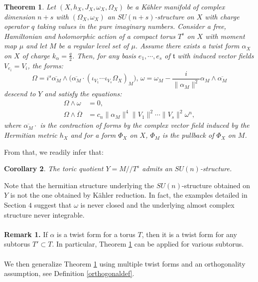 \documentclass[12pt, reqno]{amsart}
\newtheorem{introthm}{Theorem}
\newtheorem{introcor}[introthm]{Corollary}
\newcommand{\tor}{\mathfrak{t}}
\begin{document}
\begin{introthm}\label{twistsimpletheo}
        Let $(X,h_X,J_X,\omega_X,\Omega_X)$ be a Kähler manifold of complex dimension $n+s$ with $(\Omega_X,\omega_X)$ an $SU(n+s)$-structure on $X$ with charge operator $q$ taking values in the pure imaginary numbers. Consider a free, Hamiltonian and holomorphic action of a compact torus $T^s$ on $X$ with moment map $\mu$ and let $M$ be a regular level set of $\mu$. Assume there exists a twist form $\alpha_X$ on $X$ of charge $k_\alpha=\frac{q}{2}$. Then, for any basis $e_1,\cdots,e_s$ of $\tor$ with induced vector fields $V_{e_i}=V_i$, the forms: \[\Omega=i^s\overline{\alpha_M}\wedge\bigg(\overline{\alpha_M}\cdot(\iota_{V_1}\cdots\iota_{V_s}\Omega_X)_M\bigg), \,\omega=\omega_M-\frac{i} {\|\alpha_M\|^2}\alpha_M\wedge\overline{\alpha_M}\] descend to $Y$ and satisfy the equations:
        \begin{align}
            \Omega\wedge\omega&=0, \label{eq1theo}\\
            \Omega\wedge\overline{\Omega}&=c_n\|\alpha_M\|^4\|V_1\|^2\cdots\|V_s\|^2\omega^n,
        \end{align}
        where $\overline{\alpha_M}\cdot$ is the contraction of forms by the complex vector field induced by the Hermitian metric $h_X$ and for a form $\Phi_X$ on $X$, $\Phi_M$ is the pullback of $\Phi_X$ on $M$. 
\end{introthm}
From that, we readily infer that:
\begin{introcor}\label{cor1}
    The toric quotient $Y=M/\!\!/T^s$ admits an $SU(n)$-structure. 
\end{introcor}
Note that the hermitian structure underlying the $SU(n)$-structure obtained on $Y$ is not the one obtained by Kähler reduction. In fact, the examples detailed in Section $4$ suggest that $\omega$ is never closed and the underlying almost complex structure never integrable. \\ \\
\noindent\textbf{Remark 1.}
    If $\alpha$ is a twist form for a torus $T$, then it is a twist form for any subtorus $T'\subset T$. In particular, Theorem \ref{twistsimpletheo} can be applied for various subtorus. \\ \\
\indent We then generalize Theorem \ref{twistsimpletheo} using multiple twist forms and an orthogonality assumption, see Definition \ref{orthogonaldef}. 
\end{document}
